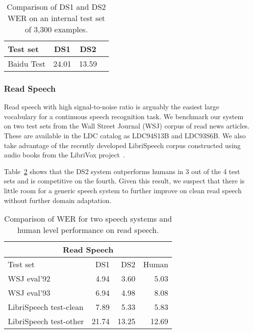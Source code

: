 \begin{table}
\centering
\begin{tabular}{l  c  c  c}
\toprule
Test set   & DS1 & DS2 \\
\midrule
Baidu Test & 24.01  & 13.59 \\
\bottomrule
\end{tabular}
\caption{Comparison of DS1 and DS2 WER on an internal test set of 3,300
         examples.}
\label{table:deepspeech2:test}
\end{table}

\subsubsection{Read Speech}

Read speech with high signal-to-noise ratio is arguably the easiest large
vocabulary for a continuous speech recognition task. We benchmark our system on
two test sets from the Wall Street Journal (WSJ) corpus of read news articles.
These are available in the LDC catalog as LDC94S13B and LDC93S6B. We also take
advantage of the recently developed LibriSpeech corpus constructed using audio
books from the LibriVox project~\cite{panayotov2015}.

Table~\ref{table:deepspeech2:readspeech} shows that the DS2 system outperforms
humans in 3 out of the 4 test sets and is competitive on the fourth. Given this
result, we suspect that there is little room for a generic speech system to
further improve on clean read speech without further domain adaptation.

\begin{table}
\centering
\begin{tabular}{l  r  r r}
\toprule
\multicolumn{4}{c}{Read Speech}\\
\midrule
Test set               & DS1   & DS2 &  Human \\ 
\midrule
WSJ eval'92            & 4.94  & 3.60  & 5.03 \\ 
WSJ eval'93            & 6.94  & 4.98  & 8.08 \\ 
LibriSpeech test-clean & 7.89  & 5.33  & 5.83 \\ 
LibriSpeech test-other & 21.74 & 13.25 & 12.69 \\ 
\bottomrule
\end{tabular}
\caption{Comparison of WER for two speech systems and human level performance
         on read speech.}
\label{table:deepspeech2:readspeech}
\end{table}

